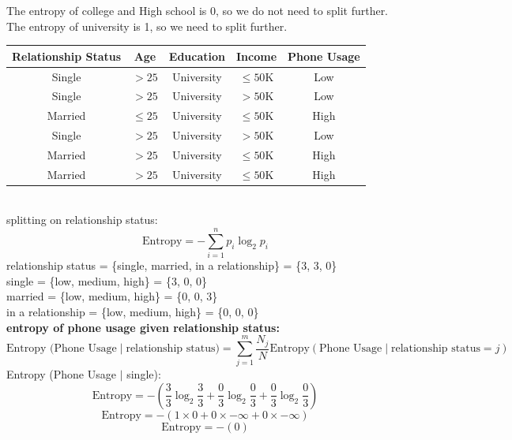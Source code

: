 \documentclass[a3paper,12pt]{extarticle} %
\begin{document}
\begin{enumerate}
\begin{center}
\begin{tikzpicture}
        \end{tikzpicture}
        \end{center}
        The entropy of college and High school is 0, so we do not need to split further. The entropy of university is 1, so we need to split further. 
        \\ \begin{tabular}{|c|c|c|c|c|}
            \hline
            \textbf{Relationship Status} & \textbf{Age} & \textbf{Education} & \textbf{Income} & \textbf{Phone Usage} \\
            \hline
            Single & $>25$ & University & $\leq50$K & Low \\
            \hline
            Single & $>25$ & University & $>50$K & Low \\
            \hline
            Married & $\leq25$ & University & $\leq50$K & High \\
            \hline
            Single & $>25$ & University & $>50$K & Low \\
            \hline
            Married & $>25$ & University & $\leq50$K & High \\
            \hline
            Married & $>25$ & University & $\leq50$K & High \\
            \hline
        \end{tabular}
        \\ splitting on relationship status:
        \[
        \text{Entropy} = -\sum_{i=1}^n p_i \log_2 p_i
        \]
        relationship status = \{single, married, in a relationship\} = \{3, 3, 0\}
        \\ single = \{low, medium, high\} = \{3, 0, 0\}
        \\ married = \{low, medium, high\} = \{0, 0, 3\}
        \\ in a relationship = \{low, medium, high\} = \{0, 0, 0\}
        \\ \textbf{entropy of phone usage given relationship status:}
        \[
        \text{Entropy (Phone Usage} \mid \text{relationship status)} = \sum_{j=1}^m \frac{N_j}{N} \text{Entropy}(\text{Phone Usage} \mid \text{relationship status} = j)
        \]
        Entropy (Phone Usage $\mid$ single):
        \[
        \text{Entropy} = -\left(\frac{3}{3} \log_2 \frac{3}{3} + \frac{0}{3} \log_2 \frac{0}{3} + \frac{0}{3} \log_2 \frac{0}{3}\right)
        \]
        \[
        \text{Entropy} = -\left(1 \times 0 + 0 \times -\infty + 0 \times -\infty\right)
        \]
        \[
            \text{Entropy} = -\left(0\right)
        \]

\end{enumerate}
\end{document}

